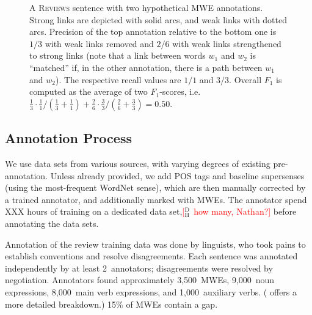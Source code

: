 \documentclass[11pt,letterpaper]{article}
\makeatletter
\newcommand{\ensuretext}[1]{#1}
\newcommand{\nssmarker}{\ensuretext{\textcolor{magenta}{\ensuremath{^{\textsc{NS}}_{\textsc{S}}}}}}
\newcommand{\dhmarker}{\ensuretext{\textcolor{red}{\ensuremath{^{\textsc{D}}_{\textsc{H}}}}}}
\newcommand{\arkcomment}[3]{\ensuretext{\textcolor{#3}{[#1 #2]}}}
\newcommand{\nss}[1]{\arkcomment{\nssmarker}{#1}{magenta}}
\newcommand{\dirk}[1]{\arkcomment{\dhmarker}{#1}{red}}
\newcommand{\tagtt}[3]{\begin{tabular}{@{\hspace{2pt}}c@{\hspace{2pt}}} \texttt{#2}\\ #1 \\ \texttt{#3}\end{tabular}}
\newcommand{\finalversion}[1]{}
\newcommand{\shortversion}[1]{}
\newcommand{\longversion}[1]{#1} %
\makeatother
\begin{document}
\begin{figure}
\caption{A \textsc{Reviews} sentence with two hypothetical MWE annotations. 
Strong links are depicted with solid arcs, and weak links with dotted arcs. 
Precision of the top annotation relative to the bottom one is $1/3$ with weak links removed 
and $2/6$ with weak links strengthened to strong links (note that a link between words $w_1$ and $w_2$ is ``matched'' 
if, in the other annotation, there is a path between $w_1$ and $w_2$). 
The respective recall values are $1/1$ and $3/3$. 
Overall $F_1$ is computed as the average of two $F_1$-scores, i.e.~$\tfrac{1}{3} \cdot \tfrac{1}{1}/(\tfrac{1}{3} + \tfrac{1}{1}) + \tfrac{2}{6}\cdot \tfrac{3}{3}/(\tfrac{2}{6}+\tfrac{3}{3}) = 0.50$.}
\label{fig:linkmeasure}
\end{figure}

\subsection{Annotation Process}
We use data sets from various sources, with varying degrees of existing pre-annotation. Unless already provided, we add POS tags and baseline supersenses (using the most-frequent WordNet sense), which are then manually corrected by a trained annotator, and additionally marked with MWEs. The annotator spend XXX hours of training on a dedicated data set,\dirk{how many, Nathan?} before annotating the data sets. 

Annotation of the review training data was done by linguists, who took pains to establish conventions and resolve disagreements.
Each sentence was annotated independently by at least 2~annotators; disagreements were resolved by negotiation. 
\longversion{Annotators found approximately 3,500~MWEs, 9,000~noun expressions, 8,000~main verb expressions, and 1,000~auxiliary verbs. 
(\Cref{tbl:reviews} offers a more detailed breakdown.)}\shortversion{\Cref{tbl:reviews}  
offers a breakdown of the annotations.}
\longversion{15\% of MWEs contain a gap.\finalversion{\nss{proportion strong/weak}}} 
\end{document}
